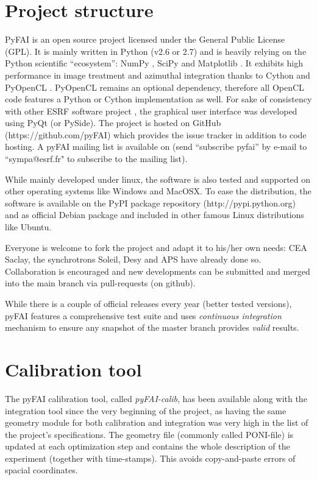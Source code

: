 \documentclass[preprint]{iucr}
\begin{document}


\appendix
\section{Project structure}

PyFAI is an open source project licensed under the General Public License (GPL).
It is mainly written in Python (v2.6 or 2.7) and is heavily relying on the
Python scientific ``ecosystem'': NumPy \cite{numpy}, SciPy \cite{scipy} and Matplotlib \cite{matplotlib}.
It exhibits high performance in image treatment and azimuthal integration
thanks to Cython \cite{cython} and PyOpenCL \cite{pyopencl}.
PyOpenCL remains an optional dependency, therefore all OpenCL code features a
Python or Cython implementation as well.
For sake of consistency with other ESRF software project \cite{pymca}, the
graphical user interface was developed using PyQt (or PySide).
The project is hosted on GitHub (https://github.com/pyFAI) which provides
the issue tracker in addition to code hosting.
A pyFAI mailing list is
available on  (send ``subscribe pyfai'' by e-mail to
``sympa@esrf.fr" to subscribe to the mailing list).

While mainly developed under linux, the software is also tested and supported on
other operating systems like Windows and MacOSX.
To ease the distribution, the software is available on the PyPI package
repository (http://pypi.python.org) and as official Debian package and included
in other famous Linux distributions like Ubuntu.

Everyone is welcome to fork the project and adapt it to his/her own needs:
CEA Saclay, the synchrotrons Soleil, Desy and APS have already done so.
Collaboration is encouraged and new developments can be submitted and merged
into the main branch via pull-requests (on github).

While there is a couple of official releases every year (better
tested versions), pyFAI features a comprehensive test suite and uses
\textit{continuous integration} mechanism to ensure any snapshot of the master
branch provides \textit{valid} results.

\section{Calibration tool}
\label{annex_calib}

The pyFAI calibration tool, called \textit{pyFAI-calib}, has been available
along with the integration tool since the very beginning of the project, as having
the same geometry module for both calibration and integration was very high in
the list of the project's specifications.
The geometry file (commonly called PONI-file) is updated at each optimization
step and contains the whole description of the experiment (together with
time-stamps).
This avoids copy-and-paste errors of spacial coordinates.
\end{document}
